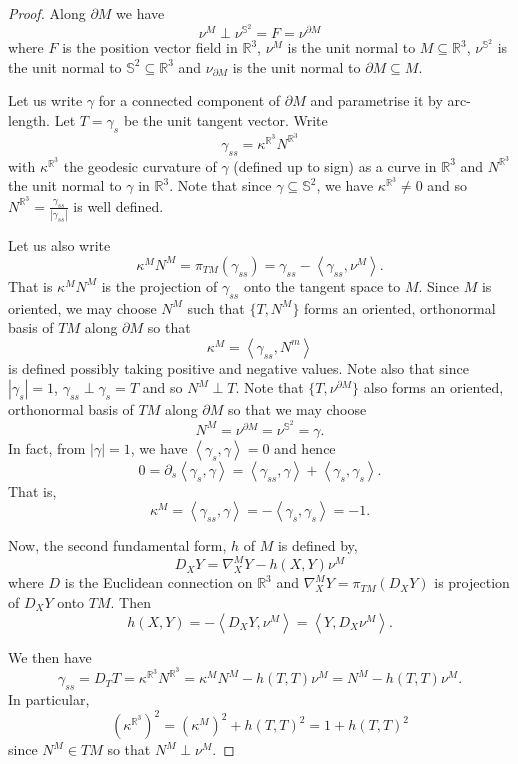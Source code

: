 \documentclass[10pt]{amsart}
\newcommand{\IP}[2]{\left< #1 , #2 \right>}
\newcommand{\R}{\ensuremath{\mathbb{R}}}
\renewcommand{\S}{\ensuremath{\mathbb{S}}}
\theoremstyle{remark}
\begin{document}
\begin{proof}
Along \(\partial M\) we have
\[
\nu^M \perp \nu^{\S^2} = F = \nu^{\partial M}
\]
where \(F\) is the position vector field in \(\R^3\), \(\nu^M\) is the unit normal to \(M \subseteq \R^3\), \(\nu^{\S^2}\) is the unit normal to \(\S^2 \subseteq \R^3\) and \(\nu_{\partial M}\) is the unit normal to \(\partial M \subseteq M\).

Let us write \(\gamma\) for a connected component of \(\partial M\) and parametrise it by arc-length. Let \(T = \gamma_s\) be the unit tangent vector. Write
\[
\gamma_{ss} = \kappa^{\R^3} N^{\R^3}
\]
with \(\kappa^{\R^3}\) the geodesic curvature of \(\gamma\) (defined up to sign) as a curve in \(\R^3\) and \(N^{\R^3}\) the unit normal to \(\gamma\) in \(\R^3\). Note that since \(\gamma \subseteq \S^2\), we have \(\kappa^{\R^3} \ne 0\) and so \(N^{\R^3} = \tfrac{\gamma_{ss}}{|\gamma_{ss}|}\) is well defined.

Let us also write
\[
\kappa^M N^M = \pi_{TM} (\gamma_{ss}) = \gamma_{ss} - \IP{\gamma_{ss}}{\nu^M}.
\]
That is \(\kappa^M N^M\) is the projection of \(\gamma_{ss}\) onto the tangent space to \(M\). Since \(M\) is oriented, we may choose \(N^M\) such that \(\{T, N^M\}\) forms an oriented, orthonormal basis of \(TM\) along \(\partial M\) so that
\[
\kappa^M = \IP{\gamma_{ss}}{N^m}
\]
is defined possibly taking positive and negative values. Note also that since \(|\gamma_s| = 1\), \(\gamma_{ss} \perp \gamma_s = T\) and so \(N^M \perp T\). Note that \(\{T, \nu^{\partial M}\}\) also forms an oriented, orthonormal basis of \(TM\) along \(\partial M\) so that we may choose
\[
N^M = \nu^{\partial M} = \nu^{\S^2} = \gamma.
\]
In fact, from \(|\gamma| = 1\), we have \(\IP{\gamma_s}{\gamma} = 0\) and hence
\[
0 = \partial_s \IP{\gamma_s}{\gamma} = \IP{\gamma_{ss}}{\gamma} + \IP{\gamma_s}{\gamma_s}.
\]
That is,
\[
\kappa^M = \IP{\gamma_{ss}}{\gamma} = -\IP{\gamma_s}{\gamma_s} = -1.
\]

Now, the second fundamental form, \(h\) of \(M\) is defined by,
\[
D_X Y = \nabla^M_X Y - h(X, Y) \nu^M
\]
where \(D\) is the Euclidean connection on \(\R^3\) and \(\nabla^M_X Y = \pi_{TM} (D_X Y)\) is projection of \(D_X Y\) onto \(TM\). Then
\[
h(X, Y) = - \IP{D_X Y}{\nu^M} = \IP{Y}{D_X \nu^M}.
\]

We then have
\[
\gamma_{ss} = D_T T = \kappa^{\R^3} N^{\R^3} = \kappa^M N^M - h(T, T) \nu^M = N^M - h(T, T) \nu^M.
\]
In particular,
\[
(\kappa^{\R^3})^2 = (\kappa^M)^2 + h(T, T)^2 = 1 + h(T, T)^2
\]
since \(N^M \in TM\) so that \(N^M \perp \nu^M\).


\end{proof}
\end{document}
